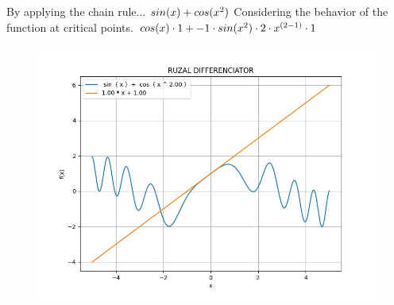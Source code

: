 \documentclass[a4paper, 12pt]{article}
\begin{document}
By applying the chain rule...\newline
$ sin( x )  +  cos(  { x } ^ {\small 2 }  ) $\newline
Considering the behavior of the function at critical points.\newline
$ cos( x )  \cdot 1 + -1 \cdot  sin(  { x } ^ {\small 2 }  )  \cdot 2 \cdot  { x } ^ {\small  ( 2 - 1 )  }  \cdot 1$\newline
\newpage
\begin{figure} [!ht]
\begin{flushleft}
\includegraphics[scale = 0.700000]{tangent.jpeg}
\end{flushleft}
\end{figure}
\end{document}
